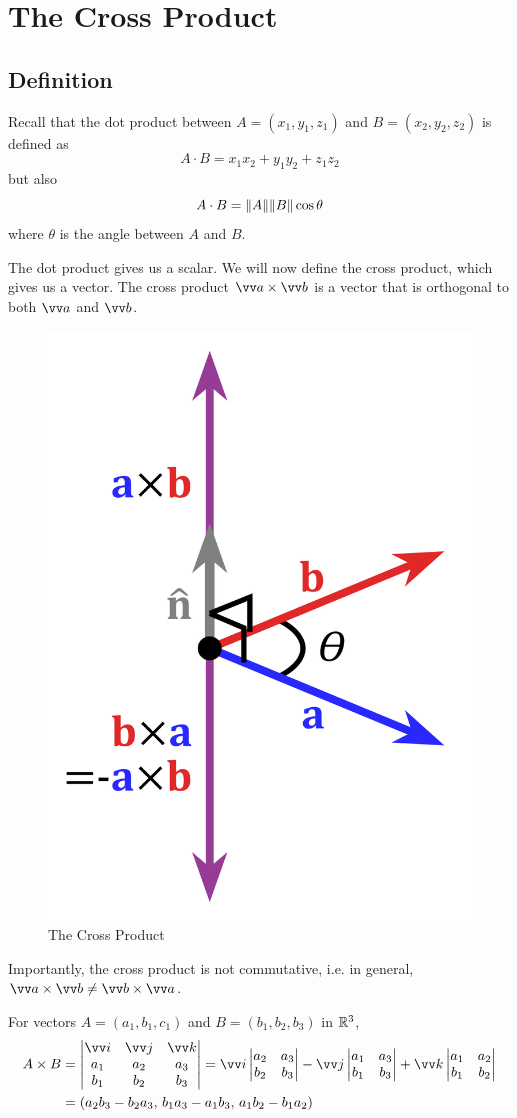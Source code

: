 \section{The Cross Product}
\subsection{Definition}

Recall that the dot product between $A=(x_1,y_1,z_1)$ and $B=(x_2,y_2,z_2)$ is defined as
$$
A \cdot B = x_1x_2+y_1y_2+z_1z_2
$$
but also
$$
A \cdot B = \lVert A \rVert\lVert B \rVert\cos\theta
$$
where $\theta$ is the angle between $A$ and $B$.

The dot product gives us a scalar. We will now define the cross product, which gives us a vector. The cross product $\vv a \times \vv b$ is a vector that is orthogonal to both $\vv a$ and $\vv b$.

\begin{figure}[ht]
    \centering
    \includegraphics[width=0.3\linewidth]{figures/cross-product.png}
    \caption{The Cross Product}
\end{figure}

Importantly, the cross product is not commutative, i.e. in general, $\vv a \times \vv b \neq \vv b \times \vv a$.

\begin{definition}
For vectors $A = (a_1,b_1,c_1)$ and $B=(b_1,b_2,b_3)$ in ${\mathbb R}^3$, 
\begin{align*}
    A \times B &= \begin{vmatrix}
    \vv i & \vv j & \vv k \\
    a_1 & a_2 & a_3 \\
    b_1 & b_2 & b_3
    \end{vmatrix} = \vv i \begin{vmatrix}
    a_2 & a_3 \\
    b_2 & b_3
    \end{vmatrix} - \vv j \begin{vmatrix}
    a_1 & a_3 \\
    b_1 & b_3
    \end{vmatrix} + \vv k \begin{vmatrix}
    a_1 & a_2 \\
    b_1 & b_2
    \end{vmatrix} \\
    &= (a_2b_3-b_2a_3,\, b_1a_3-a_1b_3,\, a_1b_2-b_1a_2)
\end{align*}
\end{definition}


